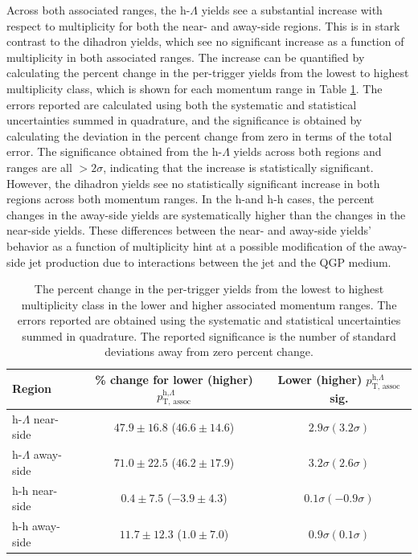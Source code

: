 Across both associated \pt ranges, the h-$\Lambda$ yields see a substantial increase with respect to multiplicity for both the near- and away-side regions. This is in stark contrast to the dihadron yields, which see no significant increase as a function of multiplicity in both associated \pt ranges.  The increase can be quantified by calculating the percent change in the per-trigger yields from the lowest to highest multiplicity class, which is shown for each momentum range in Table \ref{tab:percent_increase}. The errors reported are calculated using both the systematic and statistical uncertainties summed in quadrature, and the significance is obtained by calculating the deviation in the percent change from zero in terms of the total error. The significance obtained from the h-$\Lambda$ yields across both regions and \pt ranges are all $>2\sigma$, indicating that the increase is statistically significant. However, the dihadron yields see no statistically significant increase in both regions across both momentum ranges. In the h-\lmb and h-h cases, the percent changes in the away-side yields are systematically higher than the changes in the near-side yields. These differences between the near- and away-side yields' behavior as a function of multiplicity hint at a possible modification of the away-side jet production due to interactions between the jet and the QGP medium.

\begin{table}[h]
\centering
\caption{The percent change in the per-trigger yields from the lowest to highest multiplicity class in the lower and higher associated momentum ranges. The errors reported are obtained using the systematic and statistical uncertainties summed in quadrature. The reported significance is the number of standard deviations away from zero percent change.}
\begin{tabular}{l c c}
\hline
Region & \% change for lower (higher) $p_{\text{T, assoc}}^{\text{h,}\Lambda}$ & Lower (higher) $p_{\text{T, assoc}}^{\text{h,}\Lambda}$ sig. \\
\hline
h-$\Lambda$ near-side &  $47.9 \pm 16.8$ ($46.6 \pm 14.6$) & $ 2.9\sigma (3.2\sigma) $\\ 
h-$\Lambda$ away-side &  $71.0 \pm 22.5$ ($46.2 \pm 17.9$) & $3.2\sigma (2.6\sigma)$ \\
h-h near-side &  $ 0.4 \pm 7.5$ ($-3.9 \pm 4.3$) & $0.1\sigma (-0.9\sigma)$ \\
h-h away-side &  $11.7 \pm 12.3$ ($1.0 \pm 7.0$) & $0.9\sigma (0.1\sigma)$ \\
\hline
\end{tabular}
\label{tab:percent_increase}
\end{table}

